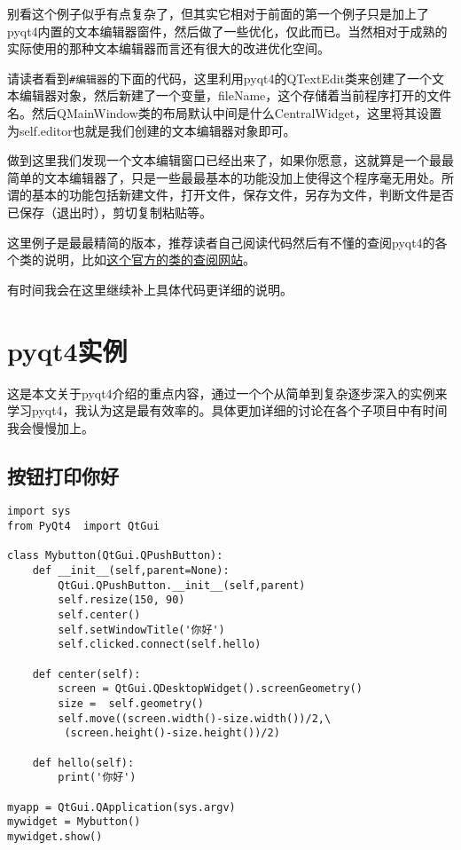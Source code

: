 \documentclass[12pt,oneside]{book}
\begin{document}
\begin{common-format}
别看这个例子似乎有点复杂了，但其实它相对于前面的第一个例子只是加上了pyqt4内置的文本编辑器窗件，然后做了一些优化，仅此而已。当然相对于成熟的实际使用的那种文本编辑器而言还有很大的改进优化空间。

请读者看到\verb+#编辑器+的下面的代码，这里利用pyqt4的QTextEdit类来创建了一个文本编辑器对象，然后新建了一个变量，fileName，这个存储着当前程序打开的文件名。然后QMainWindow类的布局默认中间是什么CentralWidget，这里将其设置为self.editor也就是我们创建的文本编辑器对象即可。

做到这里我们发现一个文本编辑窗口已经出来了，如果你愿意，这就算是一个最最简单的文本编辑器了，只是一些最最基本的功能没加上使得这个程序毫无用处。所谓的基本的功能包括新建文件，打开文件，保存文件，另存为文件，判断文件是否已保存（退出时），剪切复制粘贴等。

这里例子是最最精简的版本，推荐读者自己阅读代码然后有不懂的查阅pyqt4的各个类的说明，比如\href{http://pyqt.sourceforge.net/Docs/PyQt4/classes.html}{这个官方的类的查阅网站}。

有时间我会在这里继续补上具体代码更详细的说明。






\chapter{pyqt4实例}
这是本文关于pyqt4介绍的重点内容，通过一个个从简单到复杂逐步深入的实例来学习pyqt4，我认为这是最有效率的。具体更加详细的讨论在各个子项目中有时间我会慢慢加上。

\section{按钮打印你好}
\begin{Verbatim}
import sys
from PyQt4  import QtGui

class Mybutton(QtGui.QPushButton):
    def __init__(self,parent=None):
        QtGui.QPushButton.__init__(self,parent)
        self.resize(150, 90)
        self.center()
        self.setWindowTitle('你好')
        self.clicked.connect(self.hello)

    def center(self):
        screen = QtGui.QDesktopWidget().screenGeometry()
        size =  self.geometry()
        self.move((screen.width()-size.width())/2,\
         (screen.height()-size.height())/2)

    def hello(self):
        print('你好')

myapp = QtGui.QApplication(sys.argv)
mywidget = Mybutton()
mywidget.show()


\end{Verbatim}
\end{common-format}
\end{document}
